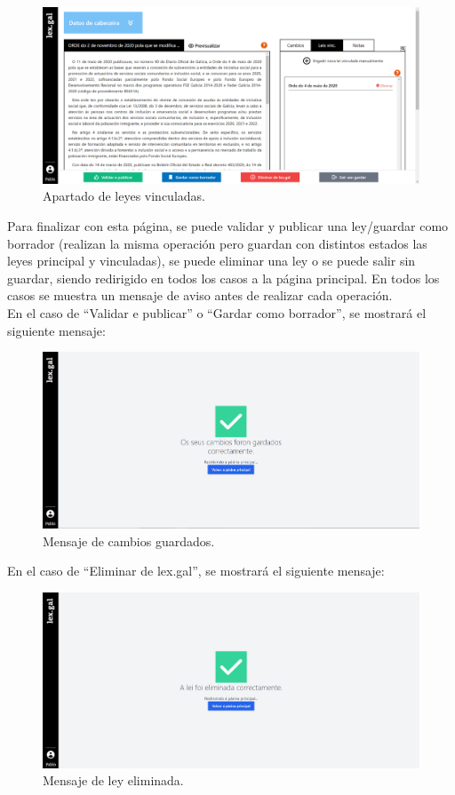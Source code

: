 \begin{figure}[H]
\centerline{\includegraphics[width=15cm]{figuras/manualUsuario/LeyesVinculadas.PNG}}
\caption{Apartado de leyes vinculadas.}
\label{enlaceLeyesVinculadas}
\end{figure}

Para finalizar con esta página, se puede validar y publicar una ley/guardar como borrador (realizan la misma operación pero guardan con distintos estados las leyes principal y vinculadas), se puede eliminar una ley o se puede salir sin guardar, siendo redirigido en todos los casos a la página principal. En todos los casos se muestra un mensaje de aviso antes de realizar cada operación.
\\

En el caso de ``Validar e publicar'' o ``Gardar como borrador'', se mostrará el siguiente mensaje:

\begin{figure}[H]
\centerline{\includegraphics[width=15cm]{figuras/manualUsuario/MensajeGuardado.PNG}}
\caption{Mensaje de cambios guardados.}
\label{enlaceCambiosGuardados}
\end{figure}

En el caso de ``Eliminar de lex.gal'', se mostrará el siguiente mensaje:

\begin{figure}[H]
\centerline{\includegraphics[width=15cm]{figuras/manualUsuario/MensajeEliminada.PNG}}
\caption{Mensaje de ley eliminada.}
\label{enlaceLeyEliminada}
\end{figure}